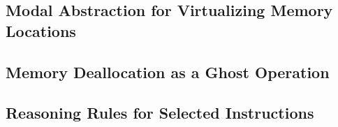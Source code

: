 \subsection{Modal Abstraction for Virtualizing Memory Locations}
\label{sec:credits}


\subsection{Memory Deallocation as a Ghost Operation}
\label{sec:free}

\subsection{Reasoning Rules for Selected Instructions}
\label{sec:reasoning}


